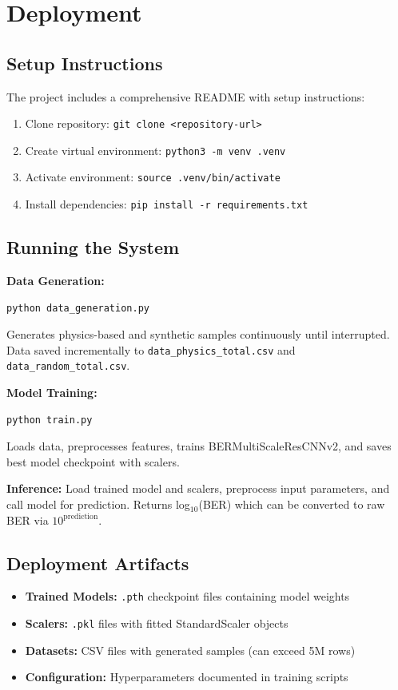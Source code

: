 \documentclass[a4paper,12pt]{report}
\begin{document}
\section{Deployment}

\subsection{Setup Instructions}

The project includes a comprehensive README with setup instructions:

\begin{enumerate}
    \item Clone repository: \texttt{git clone <repository-url>}
    \item Create virtual environment: \texttt{python3 -m venv .venv}
    \item Activate environment: \texttt{source .venv/bin/activate}
    \item Install dependencies: \texttt{pip install -r requirements.txt}
\end{enumerate}

\subsection{Running the System}

\textbf{Data Generation:}
\begin{verbatim}
python data_generation.py
\end{verbatim}
Generates physics-based and synthetic samples continuously until interrupted. Data saved incrementally to \texttt{data\_physics\_total.csv} and \texttt{data\_random\_total.csv}.

\textbf{Model Training:}
\begin{verbatim}
python train.py
\end{verbatim}
Loads data, preprocesses features, trains BERMultiScaleResCNNv2, and saves best model checkpoint with scalers.

\textbf{Inference:}
Load trained model and scalers, preprocess input parameters, and call model for prediction. Returns log$_{10}$(BER) which can be converted to raw BER via $10^{\text{prediction}}$.

\subsection{Deployment Artifacts}

\begin{itemize}
    \item \textbf{Trained Models:} \texttt{.pth} checkpoint files containing model weights
    \item \textbf{Scalers:} \texttt{.pkl} files with fitted StandardScaler objects
    \item \textbf{Datasets:} CSV files with generated samples (can exceed 5M rows)
    \item \textbf{Configuration:} Hyperparameters documented in training scripts
\end{itemize}
\end{document}
